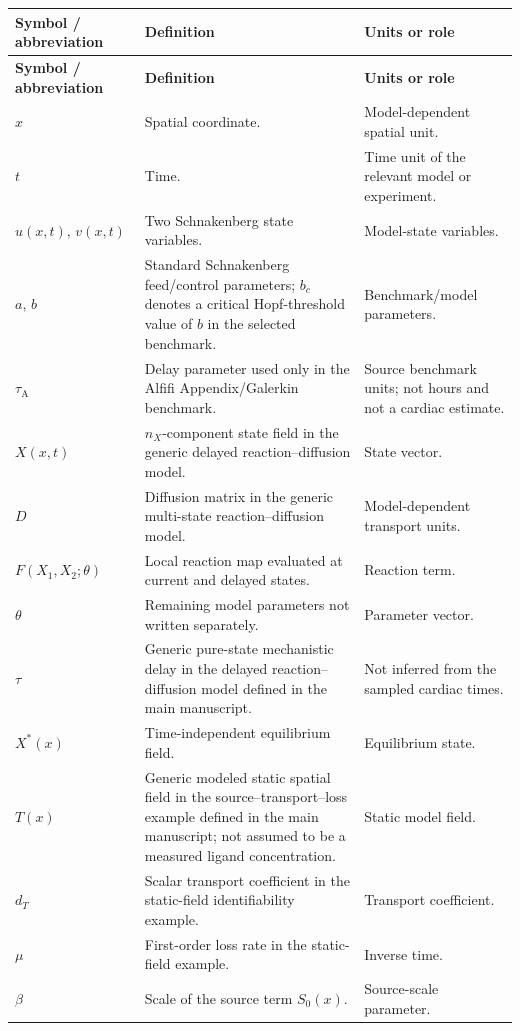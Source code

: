 \documentclass[11pt]{article}
\begin{document}
\small
\begin{longtable}{p{2.4cm}p{8.5cm}p{3.9cm}}
\toprule
\textbf{Symbol / abbreviation} & \textbf{Definition} & \textbf{Units or role}\\
\midrule
\endfirsthead
\toprule
\textbf{Symbol / abbreviation} & \textbf{Definition} & \textbf{Units or role}\\
\midrule
\endhead
$x$ & Spatial coordinate. & Model-dependent spatial unit.\\
$t$ & Time. & Time unit of the relevant model or experiment.\\
$u(x,t),\,v(x,t)$ & Two Schnakenberg state variables. & Model-state variables.\\
$a,\,b$ & Standard Schnakenberg feed/control parameters; $b_c$ denotes a critical Hopf-threshold value of $b$ in the selected benchmark. & Benchmark/model parameters.\\
$\tau_{\mathrm A}$ & Delay parameter used only in the Alfifi Appendix/Galerkin benchmark. & Source benchmark units; not hours and not a cardiac estimate.\\
$X(x,t)$ & $n_X$-component state field in the generic delayed reaction--diffusion model. & State vector.\\
$D$ & Diffusion matrix in the generic multi-state reaction--diffusion model. & Model-dependent transport units.\\
$F(X_1,X_2;\theta)$ & Local reaction map evaluated at current and delayed states. & Reaction term.\\
$\theta$ & Remaining model parameters not written separately. & Parameter vector.\\
$\tau$ & Generic pure-state mechanistic delay in the delayed reaction--diffusion model defined in the main manuscript. & Not inferred from the sampled cardiac times.\\
$X^*(x)$ & Time-independent equilibrium field. & Equilibrium state.\\
$T(x)$ & Generic modeled static spatial field in the source--transport--loss example defined in the main manuscript; not assumed to be a measured ligand concentration. & Static model field.\\
$d_T$ & Scalar transport coefficient in the static-field identifiability example. & Transport coefficient.\\
$\mu$ & First-order loss rate in the static-field example. & Inverse time.\\
$\beta$ & Scale of the source term $S_0(x)$. & Source-scale parameter.\\

\end{longtable}
\end{document}
